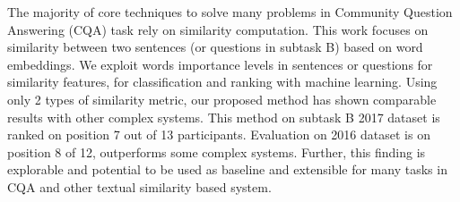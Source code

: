 The majority of core techniques to solve many problems in Community Question Answering (CQA) task rely on similarity computation. This work focuses on similarity between two sentences (or questions in subtask B) based on word embeddings. We exploit words importance levels in sentences or questions for similarity features, for classification and ranking with machine learning. Using only 2 types of similarity metric, our proposed method has shown comparable results with other complex systems. This method on subtask B 2017 dataset is ranked on position 7 out of 13 participants. Evaluation on 2016 dataset is on position 8 of 12, outperforms some complex systems. Further, this finding is explorable and potential to be used as baseline and extensible for many tasks in CQA and other textual similarity based system.
